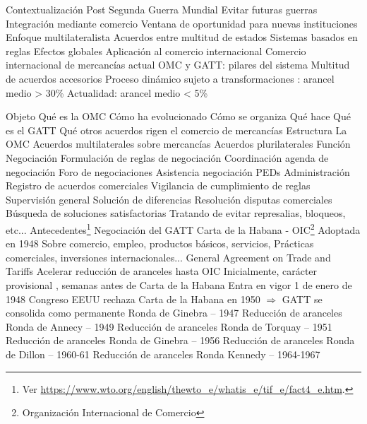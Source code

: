 \documentclass{nuevotema}
\begin{document}
\begin{esquemal}
	\1[] 
		\2 Contextualización
			\3 Post Segunda Guerra Mundial
				\4 Evitar futuras guerras
				\4 Integración mediante comercio
				\4 Ventana de oportunidad para nuevas instituciones
			\3 Enfoque multilateralista
				\4 Acuerdos entre multitud de estados
				\4[$\Rightarrow$] Sistemas basados en reglas
				\4[$\Rightarrow$] Efectos globales
				\4 Aplicación al comercio internacional
			\3 Comercio internacional de mercancías actual
				\4 OMC y GATT: pilares del sistema
				\4 Multitud de acuerdos accesorios
				\4 Proceso dinámico sujeto a transformaciones
				: arancel medio > 30\%
				\4 Actualidad: arancel medio < 5\%
			
		\2 Objeto
			\3 Qué es la OMC
			\3 Cómo ha evolucionado
			\3 Cómo se organiza
			\3 Qué hace
			\3 Qué es el GATT
			\3 Qué otros acuerdos rigen el comercio de mercancías
		\2 Estructura
			\3 La OMC
			\3 Acuerdos multilaterales sobre mercancías
			\3 Acuerdos plurilaterales
	\1 
		\2 Función
			\3 Negociación
				\4 Formulación de reglas de negociación
				\4 Coordinación agenda de negociación
				\4 Foro de negociaciones
				\4 Asistencia negociación PEDs
			\3 Administración
				\4 Registro de acuerdos comerciales
				\4 Vigilancia de cumplimiento de reglas
				\4 Supervisión general
			\3 Solución de diferencias
				\4 Resolución disputas comerciales
				\4 Búsqueda de soluciones satisfactorias
				\4[] Tratando de evitar represalias, bloqueos, etc...
		\2 Antecedentes\footnote{Ver \url{https://www.wto.org/english/thewto_e/whatis_e/tif_e/fact4_e.htm}.}
			\3 Negociación del GATT
				\4 Carta de la Habana - OIC\footnote{Organización Internacional de Comercio}
				\4[] Adoptada en 1948
				\4[] Sobre comercio, empleo, productos básicos, servicios,
				\4[] Prácticas comerciales, inversiones internacionales...
				\4 General Agreement on Trade and Tariffs
				\4[] Acelerar reducción de aranceles hasta OIC
				\4[] Inicialmente, carácter provisional
				, semanas antes de Carta de la Habana
				\4[] Entra en vigor 1 de enero de 1948
				\4 Congreso EEUU rechaza Carta de la Habana en 1950
				\4[] $\Rightarrow$ GATT se consolida como permanente
			\3 Ronda de Ginebra -- 1947
				\4 Reducción de aranceles
			\3 Ronda de Annecy -- 1949
				\4 Reducción de aranceles
			\3 Ronda de Torquay -- 1951
				\4 Reducción de aranceles
			\3 Ronda de Ginebra -- 1956
				\4 Reducción de aranceles
			\3 Ronda de Dillon -- 1960-61
				\4 Reducción de aranceles
			\3 Ronda Kennedy -- 1964-1967

\end{esquemal}
\end{document}
